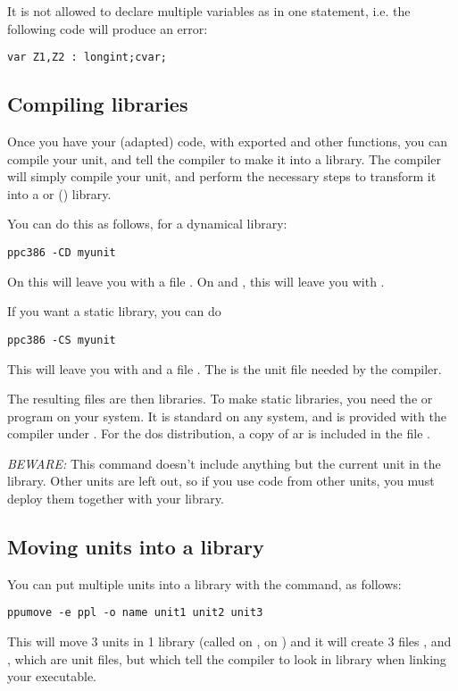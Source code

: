 It is not allowed to declare multiple variables as  in one
statement, i.e. the following code will produce an error:
\begin{verbatim}
var Z1,Z2 : longint;cvar;
\end{verbatim}

\subsection {Compiling libraries}

Once you have your (adapted) code, with exported and other functions,
you can compile your unit, and tell the compiler to make it into a library.
The compiler will simply compile your unit, and perform the necessary steps
to transform it into a  or  () library.

You can do this as follows, for a dynamical library:
\begin{verbatim}
ppc386 -CD myunit
\end{verbatim}
On \linux this will leave you with a file . On \windows
and \ostwo, this will leave you with .

If you want a static library, you can do
\begin{verbatim}
ppc386 -CS myunit
\end{verbatim}
This will leave you with  and a file .
The  is the unit file needed by the \fpc compiler.

The resulting files are then libraries. To make static libraries, you need
the  or  program on your system. It is standard on any
\linux system, and is provided with the  compiler under \dos.
For the dos distribution, a copy of ar is included in the file
.

{\em BEWARE:} This command doesn't include anything but the current unit in
the library. Other units are left out, so if you use code from other units,
you must deploy them together with your library.

\subsection{Moving units into a library}
You can put multiple units into a library with the  command, as
follows:

\begin{verbatim}
ppumove -e ppl -o name unit1 unit2 unit3
\end{verbatim}
This will move 3 units in 1 library (called  on \linux,
 on \windows) and it will create 3 files ,
 and , which are unit files, but which tell
the compiler to look in library  when linking your executable.

